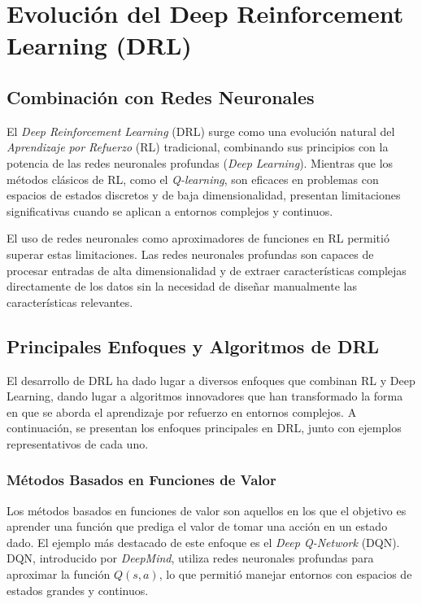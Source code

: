 \documentclass[a4paper,12pt, twoside]{report}
\begin{document}
\section{Evolución del Deep Reinforcement Learning (DRL)}

\subsection{Combinación con Redes Neuronales}

El \textit{Deep Reinforcement Learning} (DRL) surge como una evolución natural del 
\textit{Aprendizaje por Refuerzo} (RL) tradicional, combinando sus principios con la potencia 
de las redes neuronales profundas (\textit{Deep Learning}). Mientras que los métodos clásicos 
de RL, como el \textit{Q-learning}, son eficaces en problemas con espacios de estados discretos 
y de baja dimensionalidad, presentan limitaciones significativas cuando se aplican a entornos 
complejos y continuos.

El uso de redes neuronales como aproximadores de funciones en RL permitió superar estas 
limitaciones. Las redes neuronales profundas son capaces de procesar entradas de alta 
dimensionalidad y de extraer características complejas directamente de los datos sin la necesidad 
de diseñar manualmente las características relevantes. 

\subsection{Principales Enfoques y Algoritmos de DRL}

El desarrollo de DRL ha dado lugar a diversos enfoques que combinan RL y Deep Learning, dando 
lugar a algoritmos innovadores que han transformado la forma en que se aborda el aprendizaje 
por refuerzo en entornos complejos. A continuación, se presentan los enfoques principales en 
DRL, junto con ejemplos representativos de cada uno.

\subsubsection{Métodos Basados en Funciones de Valor}

Los métodos basados en funciones de valor son aquellos en los que el objetivo es aprender 
una función que prediga el valor de tomar una acción en un estado dado. El ejemplo más 
destacado de este enfoque es el \textit{Deep Q-Network} (DQN). DQN, introducido por 
\textit{DeepMind}, utiliza redes neuronales profundas para aproximar la función \(Q(s, a)\), 
lo que permitió manejar entornos con espacios de estados grandes y continuos.
\end{document}

